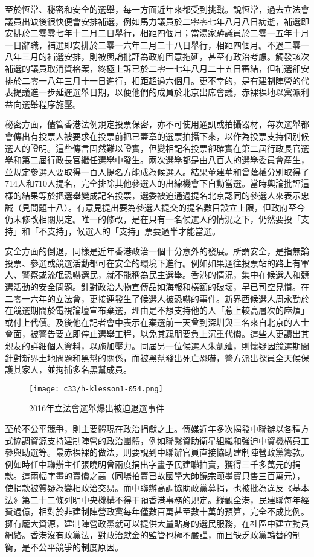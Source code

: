 至於恆常、秘密和安全的選舉，每一方面近年來都受到挑戰。說恆常，過去立法會議員出缺後很快便會安排補選，例如馬力議員於二零零七年八月八日病逝，補選即安排於二零零七年十二月二日舉行，相距四個月；當湯家驊議員於二零一五年十月一日辭職，補選即安排於二零一六年二月二十八日舉行，相距四個月。不過二零一八年三月的補選安排，則被輿論批評為政府固意拖延，甚至有政治考慮。觸發該次補選的議員取消資格案，終極上訴已於二零一七年八月二十五日審結，但補選卻安排於二零一八年三月十一日進行，相距超過六個月。更不幸的，是有建制陣營的代表提議進一步延遲選舉日期，以便他們的成員於北京出席會議，赤裸裸地以黨派利益向選舉程序施壓。

秘密方面，儘管香港法例規定投票保密，亦不可使用通訊或拍攝器材，每次選舉都會傳出有投票人被要求在投票前把已蓋章的選票拍攝下來，以作為投票支持個別候選人的證明。這些傳言固然難以證實，但變相記名投票卻確實在第二屆行政長官選舉和第二屆行政長官繼任選舉中發生。兩次選舉都是由八百人的選舉委員會產生，並規定參選人要取得一百人提名方能成為候選人。結果董建華和曾蔭權分別取得了714人和710人提名，完全排除其他參選人的出線機會下自動當選。當時輿論批評這樣的結果等於把選舉變成記名投票，選委被迫通過提名北京認同的參選人來表示忠誠（見問題十八）。有意見提出要為參選人提交的提名數目設立上限，但政府至今仍未修改相關規定。唯一的修改，是在只有一名候選人的情況之下，仍然要投「支持」和「不支持」，候選人的「支持」票要過半才能當選。

安全方面的倒退，同樣是近年香港政治一個十分意外的發展。所謂安全，是指無論投票、參選或競選活動都可在安全的環境下進行。例如如果通往投票站的路上有軍人、警察或流氓恐嚇選民，就不能稱為民主選舉。香港的情況，集中在候選人和競選活動的安全問題。針對政治人物宣傳品如海報和橫額的破壞，早已司空見慣。在二零一六年的立法會，更接連發生了候選人被恐嚇的事件。新界西候選人周永勤於在競選期間於電視論壇宣布棄選，理由是不想支持他的人「惹上較高層次的麻煩」或付上代價。及後他在記者會中表示在棄選前一天曾到深圳與三名來自北京的人士會面，被警告要立即停止選舉工程，以免其親朋要負上沉重代價。這些人更讀出其親友的詳細個人資料，以施加壓力。同屆另一位候選人朱凱廸，則懷疑因競選期間針對新界土地問題和黑幫的關係，而被黑幫發出死亡恐嚇，警方派出探員全天候保護其家人，並拘捕多名黑幫成員。

\begin{figure}[htbp]
    \centering
    \texttt{[image: c33/h-klesson1-054.png]}
    \caption{2016年立法會選舉爆出被迫退選事件} 
\end{figure}

至於不公平競爭，則主要體現在政治捐獻之上。傳媒近年多次揭發中聯辦以各種方式協調資源支持建制陣營的政治團體，例如聯繫資助衛星組織和強迫中資機構員工參與助選等。最赤裸裸的做法，則要說到中聯辦官員直接協助建制陣營政黨籌款。例如時任中聯辦主任張曉明曾兩度捐出字畫予民建聯拍賣，獲得三千多萬元的捐款。這兩幅字畫的賣價之高（同場拍賣已故國學大師饒宗頤墨寶只售三百萬元），使捐款被質疑為變相政治交易。而中聯辦高調協助政黨募捐，也被批為違反《基本法》第二十二條列明中央機構不得干預香港事務的規定。縱觀全港，民建聯每年經費過億，相對於非建制陣營政黨每年僅數百萬甚至數十萬的預算，完全不成比例。擁有龐大資源，建制陣營政黨就可以提供大量貼身的選民服務，在社區中建立動員網絡。香港沒有政黨法，對政治獻金的監管也極不嚴謹，而且缺乏政黨輪替的制衡，是不公平競爭的制度原因。

